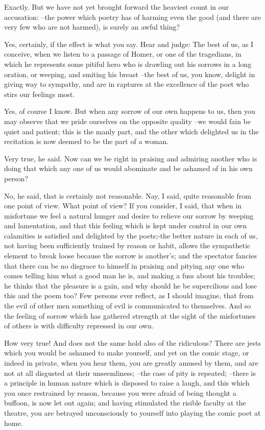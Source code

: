 Exactly.
But we have not yet brought forward the heaviest count in our accusation: --the power which poetry has of harming even the good (and there are very few who are not harmed), is surely an awful thing?

Yes, certainly, if the effect is what you say.
Hear and judge: The best of us, as I conceive, when we listen to a passage of Homer, or one of the tragedians, in which he represents some pitiful hero who is drawling out his sorrows in a long oration, or weeping, and smiting his breast --the best of us, you know, delight in giving way to sympathy, and are in raptures at the excellence of the poet who stirs our feelings most.

Yes, of course I know.
But when any sorrow of our own happens to us, then you may observe that we pride ourselves on the opposite quality --we would fain be quiet and patient; this is the manly part, and the other which delighted us in the recitation is now deemed to be the part of a woman.

Very true, he said.
Now can we be right in praising and admiring another who is doing that which any one of us would abominate and be ashamed of in his own person?

No, he said, that is certainly not reasonable.
Nay, I said, quite reasonable from one point of view.
What point of view?
If you consider, I said, that when in misfortune we feel a natural hunger and desire to relieve our sorrow by weeping and lamentation, and that this feeling which is kept under control in our own calamities is satisfied and delighted by the poets;-the better nature in each of us, not having been sufficiently trained by reason or habit, allows the sympathetic element to break loose because the sorrow is another's; and the spectator fancies that there can be no disgrace to himself in praising and pitying any one who comes telling him what a good man he is, and making a fuss about his troubles; he thinks that the pleasure is a gain, and why should he be supercilious and lose this and the poem too? Few persons ever reflect, as I should imagine, that from the evil of other men something of evil is communicated to themselves. And so the feeling of sorrow which has gathered strength at the sight of the misfortunes of others is with difficulty repressed in our own.

How very true!
And does not the same hold also of the ridiculous? There are jests which you would be ashamed to make yourself, and yet on the comic stage, or indeed in private, when you hear them, you are greatly amused by them, and are not at all disgusted at their unseemliness; --the case of pity is repeated; --there is a principle in human nature which is disposed to raise a laugh, and this which you once restrained by reason, because you were afraid of being thought a buffoon, is now let out again; and having stimulated the risible faculty at the theatre, you are betrayed unconsciously to yourself into playing the comic poet at home.

